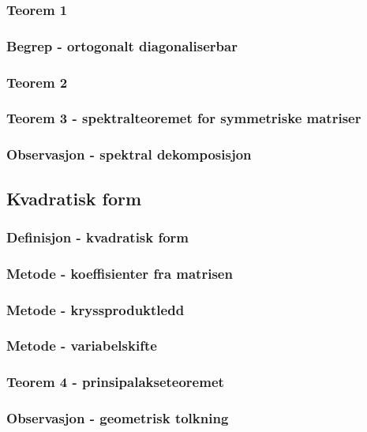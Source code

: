 \documentclass{article}
\begin{document}
      \subsubsection{Teorem 1}
        
      \subsubsection{Begrep - ortogonalt diagonaliserbar}
        
      \subsubsection{Teorem 2}
        
      \subsubsection{Teorem 3 - spektralteoremet for symmetriske matriser}
        
      \subsubsection{Observasjon - spektral dekomposisjon}
        
    \subsection{Kvadratisk form}
      \subsubsection{Definisjon - kvadratisk form}
        
      \subsubsection{Metode - koeffisienter fra matrisen}
        
      \subsubsection{Metode - kryssproduktledd}
        
      \subsubsection{Metode - variabelskifte}
        
      \subsubsection{Teorem 4 - prinsipalakseteoremet}
        
      \subsubsection{Observasjon - geometrisk tolkning}
        
\end{document}
